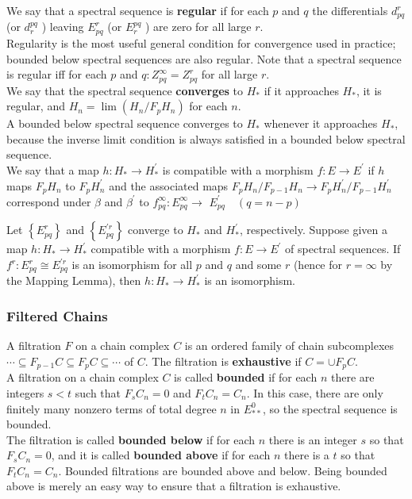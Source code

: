 \begin{example}
We say that a spectral sequence is \textbf{regular} if for each $p$ and $q$ the differentials $d_{p q}^r$ (or $d_r^{p q}$ ) leaving $E_{p q}^r$ (or $E_r^{p q}$ ) are zero for all large $r$. \\
Regularity is the most useful general condition for convergence used in practice; bounded below spectral sequences are also regular. Note that a spectral sequence is regular iff for each $p$ and $q: Z_{p q}^{\infty}=Z_{p q}^r$ for all large $r$.\\

We say that the spectral sequence \textbf{converges} to $H_*$ if it approaches $H_*$, it is regular, and $H_n=\lim \left(H_n / F_p H_n\right)$ for each $n$.\\ 
A bounded below spectral sequence converges to $H_*$ whenever it approaches $H_*$, because the inverse limit condition is always satisfied in a bounded below spectral sequence.\\
We say that a map $h: H_* \rightarrow H_*^{\prime}$ is compatible with a morphism $f: E \rightarrow E^{\prime}$ if $h$ maps $F_p H_n$ to $F_p H_n^{\prime}$ and the associated maps $F_p H_n / F_{p-1} H_n \rightarrow F_p H_n^{\prime} / F_{p-1} H_n^{\prime}$ correspond under $\beta$ and $\beta^{\prime}$ to $f_{p q}^{\infty}: E_{p q}^{\infty} \rightarrow$ $E_{p q}^{\prime} \quad(q=n-p)$

\begin{theo}
Let $\left\{E_{p q}^r\right\}$ and $\left\{E_{p q}^{\prime r}\right\}$ converge to $H_*$ and $H_*^{\prime}$, respectively. Suppose given a map $h: H_* \rightarrow H_*^{\prime}$ compatible with a morphism $f: E \rightarrow E^{\prime}$ of spectral sequences. If $f^r: E_{p q}^r \cong E_{p q}^{\prime r}$ is an isomorphism for all $p$ and $q$ and some $r$ (hence for $r=\infty$ by the Mapping Lemma), then $h: H_* \rightarrow H_*^{\prime}$ is an isomorphism. 
\end{theo}

\subsubsection*{Filtered Chains}
A filtration $F$ on a chain complex $C$ is an ordered family of chain subcomplexes $\cdots \subseteq F_{p-1} C \subseteq F_p C \subseteq \cdots$ of $C$. The filtration is \textbf{exhaustive} if $C=\cup F_p C$. \\
A filtration on a chain complex $C$ is called \textbf{bounded} if for each $n$ there are integers $s<t$ such that $F_s C_n=0$ and $F_t C_n=C_n$. In this case, there are only finitely many nonzero terms of total degree $n$ in $E_{* *}^0$, so the spectral sequence is bounded.\\
The filtration is called \textbf{bounded below} if for each $n$ there is an integer $s$ so that $F_s C_n=0$, and it is called \textbf{bounded above} if for each $n$ there is a $t$ so that $F_t C_n=C_n$. Bounded filtrations are bounded above and below. Being bounded above is merely an easy way to ensure that a filtration is exhaustive. %


\end{example}

